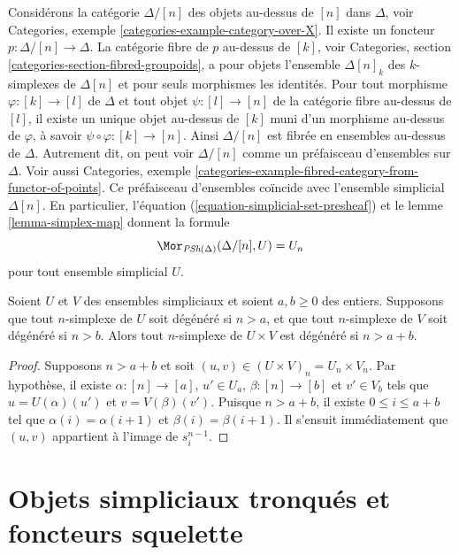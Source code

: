 \begin{example}
\label{example-simplex-category}
Considérons la catégorie $\Delta/[n]$ des objets au-dessus de $[n]$ dans
$\Delta$, voir Categories, exemple \ref{categories-example-category-over-X}.
Il existe un foncteur $p : \Delta/[n] \to \Delta$.
La catégorie fibre de $p$ au-dessus de $[k]$, voir Categories,
section \ref{categories-section-fibred-groupoids}, a pour objets l'ensemble
$\Delta[n]_k$ des $k$-simplexes de $\Delta[n]$ et pour seuls morphismes
les identités. Pour tout morphisme $\varphi : [k] \to [l]$ de $\Delta$
et tout objet $\psi : [l] \to [n]$ de la catégorie fibre au-dessus de
$[l]$, il existe un unique objet au-dessus de $[k]$ muni d'un morphisme
au-dessus de $\varphi$, à savoir $\psi \circ \varphi : [k] \to [n]$.
Ainsi $\Delta/[n]$ est fibrée en ensembles au-dessus de $\Delta$.
Autrement dit, on peut voir $\Delta/[n]$ comme un préfaisceau d'ensembles
sur $\Delta$. Voir aussi Categories, exemple
\ref{categories-example-fibred-category-from-functor-of-points}.
Ce préfaisceau d'ensembles coïncide avec l'ensemble simplicial $\Delta[n]$.
En particulier, l'équation (\ref{equation-simplicial-set-presheaf}) et le
lemme \ref{lemma-simplex-map} donnent la formule
$$
\Mor_{\textit{PSh}(\Delta)}(\Delta/[n], U) = U_n
$$
pour tout ensemble simplicial $U$.
\end{example}

\begin{lemma}
\label{lemma-product-degenerate}
Soient $U$ et $V$ des ensembles simpliciaux et soient $a, b \geq 0$
des entiers. Supposons que tout $n$-simplexe de $U$ soit dégénéré si
$n > a$, et que tout $n$-simplexe de $V$ soit dégénéré si $n > b$.
Alors tout $n$-simplexe de $U \times V$ est dégénéré si $n > a + b$.
\end{lemma}

\begin{proof}
Supposons $n > a + b$ et soit
$(u, v) \in (U \times V)_n = U_n \times V_n$.
Par hypothèse, il existe $\alpha : [n] \to [a]$, $u' \in U_a$,
$\beta : [n] \to [b]$ et $v' \in V_b$ tels que
$u = U(\alpha)(u')$ et $v = V(\beta)(v')$. Puisque $n > a + b$,
il existe $0 \leq i \leq a + b$ tel que
$\alpha(i) = \alpha(i + 1)$ et $\beta(i) = \beta(i + 1)$.
Il s'ensuit immédiatement que $(u, v)$ appartient à l'image de
$s^{n - 1}_i$.
\end{proof}



\section{Objets simpliciaux tronqués et foncteurs squelette}
\label{section-skeleton}

